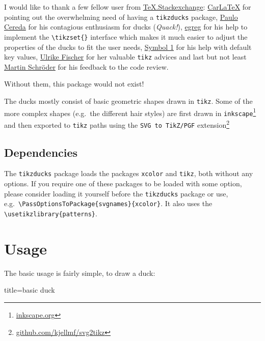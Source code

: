 \documentclass{ltxdockit}
\newcommand{\tikzducks}{\texttt{tikzducks}\xspace}
\begin{document}
I would like to thank a few fellow user from \href{https://tex.stackexchange.com/}{TeX.Stackexchange}: \href{https://tex.stackexchange.com/users/101651/carlatex}{CarLaTeX} for pointing out the overwhelming need of having a \tikzducks package,
\href{https://tex.stackexchange.com/users/3094/paulo-cereda}{Paulo Cereda} for his contagious enthusiasm for ducks (\emph{Quack!}),
\href{https://tex.stackexchange.com/users/4427/egreg}{egreg} for his help to implement the \verb|\tikzset{}| interface which makes it much easier to adjust the properties of the ducks to fit the user needs, \href{https://tex.stackexchange.com/users/51022/symbol-1}{Symbol 1} for his help with default key values, \href{https://tex.stackexchange.com/users/2388/ulrike-fischer}{Ulrike Fischer} for her valuable \texttt{tikz} advices and last but not least \href{https://tex.stackexchange.com/users/5763/martin-schr%c3%b6der}{Martin Schr\"oder} for his feedback to the code review.

\bigskip\noindent
Without them, this package would not exist!

The ducks mostly consist of basic geometric shapes drawn in \texttt{tikz}. Some of the more complex shapes (e.g.\ the different hair styles) are first drawn in \texttt{inkscape}\footnote{\url{inkscape.org}} and then exported to \texttt{tikz} paths using the \texttt{SVG to TikZ/PGF} extension\footnote{\url{github.com/kjellmf/svg2tikz}}



\subsection{Dependencies}

The \tikzducks package loads the packages \texttt{xcolor} and \texttt{tikz}, both without any options. If you require one of these packages to be loaded with some option, please consider loading it yourself before the \tikzducks package or use, e.g.\ \verb|\PassOptionsToPackage{svgnames}{xcolor}|.
It also uses the \verb|\usetikzlibrary{patterns}|.

\section{Usage}

The basic usage is fairly simple, to draw a duck:
\begin{tcblisting}{title={basic duck}}
\begin{tikzpicture}
	\duck
\end{tikzpicture}
\end{tcblisting}
\end{document}
